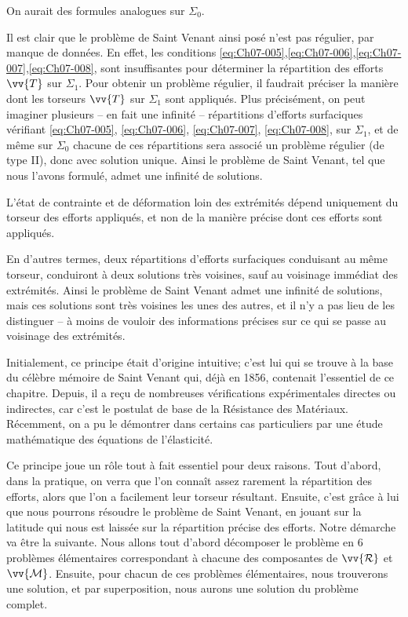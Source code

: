 On aurait des formules analogues sur $\Sigma_0$.

Il est clair que le problème de Saint Venant ainsi posé n'est pas régulier, par manque de données.
En effet, les conditions \eqref{eq:Ch07-005},\eqref{eq:Ch07-006},\eqref{eq:Ch07-007},\eqref{eq:Ch07-008}, sont insuffisantes pour déterminer la répartition des efforts $\vv{T}$ sur $\Sigma_1$.
Pour obtenir un problème régulier, il faudrait préciser la manière dont les torseurs $\vv{T}$ sur $\Sigma_1$ sont appliqués.
Plus précisément, on peut imaginer plusieurs --	en fait une infinité -- répartitions d'efforts surfaciques vérifiant \eqref{eq:Ch07-005}, \eqref{eq:Ch07-006}, \eqref{eq:Ch07-007}, \eqref{eq:Ch07-008}, sur $\Sigma_1$, et de même sur $\Sigma_0$ chacune de ces répartitions sera associé un problème régulier (de type II), donc avec solution unique.
Ainsi le problème de Saint Venant, tel que nous l'avons formulé, admet une infinité de solutions.

\begin{Principe}
    L'état de contrainte et de déformation loin des extrémités dépend uniquement du torseur des efforts appliqués, et non de la manière précise dont ces efforts sont appliqués.
\end{Principe}

En d'autres termes, deux répartitions d'efforts surfaciques conduisant au même torseur, conduiront à deux solutions très voisines, sauf au voisinage immédiat des extrémités.
Ainsi le problème de Saint Venant admet une infinité de solutions, mais ces solutions sont très voisines les unes des autres, et il n'y a pas lieu de les distinguer -- à moins de vouloir des informations précises sur ce qui se passe au voisinage des extrémités.

Initialement, ce principe était d'origine intuitive; c'est lui qui se trouve à la base du célèbre mémoire de Saint Venant qui, déjà en 1856, contenait l'essentiel de ce chapitre.
Depuis, il a reçu de nombreuses vérifications expérimentales directes ou indirectes, car c'est le postulat de base de la Résistance des Matériaux.
Récemment, on a pu le démontrer dans certains cas particuliers par une étude mathématique des équations de l'élasticité.

Ce principe joue un rôle tout à fait essentiel pour deux raisons.
Tout d'abord, dans la pratique, on verra que l'on connaît assez rarement la répartition des efforts, alors que l'on a facilement leur torseur résultant.
Ensuite, c'est grâce à lui que nous pourrons résoudre le problème de Saint Venant, en jouant sur la latitude qui nous est laissée sur la répartition précise des efforts.
Notre démarche va être la suivante.
Nous allons tout d'abord décomposer le problème en 6 problèmes élémentaires correspondant à chacune des composantes de $\vv{\mathcal{R}}$ et $\vv{\mathcal{M}}$.
Ensuite, pour chacun de ces problèmes élémentaires, nous trouverons une solution, et par superposition, nous aurons une solution du problème complet.

